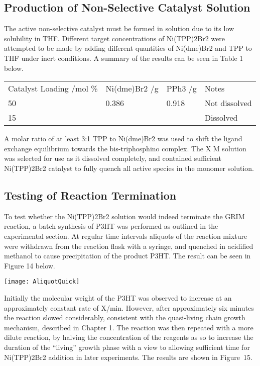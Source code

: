 \subsection{Production of Non-Selective Catalyst Solution}

The active non-selective catalyst must be formed in solution due to its low solubility in THF. Different target concentrations of Ni(TPP)2Br2 were attempted to be made by adding different quantities of Ni(dme)Br2 and TPP to THF under inert conditions. A summary of the results can be seen in Table 1 below.

\begin{table}[]
	\begin{tabular}{llll}
		Catalyst Loading /mol \% & Ni(dme)Br2 /g & PPh3 /g & Notes         \\
		50                       & 0.386         & 0.918   & Not dissolved \\
		15                       &               &         & Dissolved    
	\end{tabular}
\end{table}

A molar ratio of at least 3:1 TPP to Ni(dme)Br2 was used to shift the ligand exchange equilibrium towards the bis-triphosphino complex. The X M solution was selected for use as it dissolved completely, and contained sufficient Ni(TPP)2Br2 catalyst to fully quench all active species in the monomer solution.

\subsection{Testing of Reaction Termination}

To test whether the Ni(TPP)2Br2 solution would indeed terminate the GRIM reaction, a batch synthesis of P3HT was performed as outlined in the experimental section. At regular time intervals aliquots of the reaction mixture were withdrawn from the reaction flask with a syringe, and quenched in acidified methanol to cause precipitation of the product P3HT. The result can be seen in Figure 14 below.

\texttt{[image: AliquotQuick]}

Initially the molecular weight of the P3HT was observed to increase at an approximately constant rate of X/min. However, after approximately six minutes the reaction slowed considerably, consistent with the quasi-living chain growth mechanism, described in Chapter 1. The reaction was then repeated with a more dilute reaction, by halving the concentration of the reagents as so to increase the duration of the “living” growth phase with a view to allowing sufficient time for Ni(TPP)2Br2 addition in later experiments. The results are shown in Figure 15.

